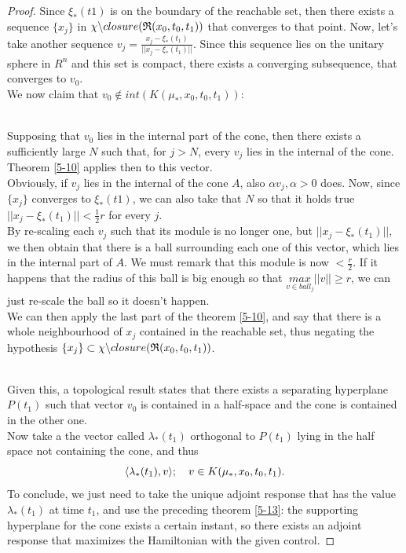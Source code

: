 \begin{proof}
		Since $\xi_*(t1)$ is on the boundary of the reachable set, then there exists a sequence $\{x_j\}$ in $\chi\backslash closure(\mathfrak{R}(x_0,t_0,t_1))$ that converges to that point. Now, let's take another sequence $v_j=\frac{x_j-\xi_*(t_1)}{||x_j-\xi_*(t_1)||}$. Since this sequence lies on the unitary sphere in $R^{n}$ and this set is compact, there exists a converging subsequence, that converges to $v_0$.\\
	We now claim that $v_0\notin int(K(\mu_*,x_0,t_0,t_1))$:\\\\
	\begin{minipage}{0.07\linewidth}
		 \mbox{}
	\end{minipage}
	\begin{minipage}{0.9\linewidth}
		 Supposing that $v_0$ lies in the internal part of the cone, then there exists a sufficiently large $N$ such that, for $j>N$, every $v_j$ lies in the internal of the cone. Theorem \ref{5-10} applies then to this vector.\\
		 Obviously, if $v_j$ lies in the internal of the cone $A$, also $\alpha v_j,\alpha>0$ does.
		 Now, since $\{x_j\}$ converges to $\xi_*(t1)$, we can also take that $N$ so that it holds true  $||x_j-\xi_*(t_1)||<\frac{1}{2}r$ for every $j$.\\
		 By re-scaling each $v_j$ such that its module is no longer one, but $||x_j-\xi_*(t_1)||$, we then obtain that there is a ball surrounding each one of this vector, which lies in the internal part of  $A$. We must remark that this module is now $<\frac{r}{2}$. If it happens that the radius of this ball is big enough so that $\underset{v\in ball_j}{max}||v||\geq r$, we can just re-scale the ball so it doesn't happen.\\
		 We can then apply the last part of the theorem \ref{5-10}, and say that there is a whole neighbourhood of $x_j$ contained in the reachable set, thus negating the hypothesis $\{x_j\}\subset\chi\backslash closure(\mathfrak{R}(x_0,t_0,t_1))$.
	\end{minipage}\\
	Given this, a topological result states that there exists a separating hyperplane $P(t_1)$ such that vector $v_0$ is contained in a half-space and the cone is contained in the other one.\\
	Now take a the vector called $\lambda_*(t_1)$ orthogonal to $P(t_1)$ lying in the half space not containing the cone, and thus \[\langle \lambda_*(t_1),v\rangle;\text{\space\space\space}v\in K(\mu_*,x_0,t_0,t_1).\]
	To conclude, we just need to take the unique adjoint response that has the value $\lambda_*(t_1)$ at time $t_1$, and use the preceding theorem \ref{5-13}: the supporting hyperplane for the cone exists a certain instant, so there exists an adjoint response that maximizes the Hamiltonian with the given control.
\end{proof}

